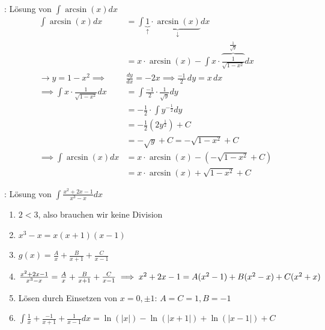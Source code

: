 \begin{minipage}{\linewidth}
\Bsp {}: Lösung von $\displaystyle \int \arcsin(x) dx$
\vspace{-0.6em}
\begin{align*}
    \int \arcsin(x) dx &= \int \underbrace{1}_\uparrow \cdot \underbrace{\arcsin(x)}_\downarrow dx \\[-2.6em]
                       &= x \cdot \arcsin(x) - \int x \cdot \overbrace{\frac{1}{\sqrt{1-x^2}}}^{\frac{1}{\sqrt{y}}} dx \\
    \longrightarrow y = 1 - x^2 \implies& \frac{dy}{dx} = -2x \implies \frac{-1}{2} \, dy = x \, dx \\[-0.1em]
    \implies \int x \cdot \frac{1}{\sqrt{1-x^2}} dx &= \int \frac{-1}{2} \cdot \frac{1}{\sqrt{y}} dy \\[-0.1em]
                       &= -\frac{1}{2} \cdot \int y^{-\frac{1}{2}} dy \\[-0.3em]
                       &= -\frac{1}{2} (2y^{\frac{1}{2}}) + C \\[-0.3em]
                       &= -\sqrt{y} + C = -\sqrt{1-x^2} + C \\
    \implies \int \arcsin(x) dx &= x \cdot \arcsin(x) - (-\sqrt{1 - x^2} + C) \\[-0.8em]
                                &= x \cdot \arcsin(x) + \sqrt{1 - x^2} + C
\end{align*}
\end{minipage}

\Bsp {}: Lösung von $\displaystyle \int \frac{x^2 + 2x - 1}{x^3 - x} dx$
\vspace{-0.6em}
\begin{enumerate}
    \item $2 < 3$, also brauchen wir keine Division
    \item $x^3 - x = x(x+1)(x-1)$
    \item $g(x) = \frac{A}{x} + \frac{B}{x + 1} + \frac{C}{x - 1}$
    \item $\frac{x^2 + 2x - 1}{x^3 - x} = \frac{A}{x} + \frac{B}{x + 1} + \frac{C}{x - 1} \\
    \implies x^2 + 2x -1 = A(x^2 - 1) + B(x^2 - x) + C(x^2 + x)$
    \item Lösen durch Einsetzen von $x = 0, \pm 1$: $A = C = 1, B = -1$
    \item $\displaystyle \int \frac{1}{x} + \frac{-1}{x+1} + \frac{1}{x-1} dx = \ln(|x|) - \ln(|x+1|) + \ln(|x-1|) + C$
\end{enumerate}


